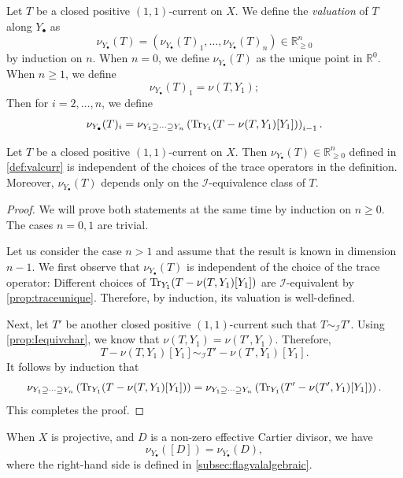 \begin{definition}\label{def:valcurr}
    Let $T$ be a closed positive $(1,1)$-current on $X$. We define the \emph{valuation} of $T$ along $Y_{\bullet}$ as
    \[
        \nu_{Y_{\bullet}}(T)=\left(\nu_{Y_{\bullet}}(T)_1,\ldots,\nu_{Y_{\bullet}}(T)_n\right)\in \mathbb{R}_{\geq 0}^n
    \]
    by induction on $n$. When $n=0$, we define $\nu_{Y_{\bullet}}(T)$ as the unique point in $\mathbb{R}^0$. When $n\geq 1$, we define
    \[
        \nu_{Y_{\bullet}}(T)_1=\nu(T,Y_1);
    \]
    Then for $i=2,\ldots,n$, we define
    \[
        \nu_{Y_{\bullet}}(T)_i=\nu_{Y_1\supseteq \cdots \supseteq Y_n}\left(\operatorname{Tr}_{Y_1}(T-\nu(T,Y_1)[Y_1])\right)_{i-1}.
    \]
\end{definition}

\begin{proposition}\label{prop:valcurr_Iind}
    Let $T$ be a closed positive $(1,1)$-current on $X$. Then $\nu_{Y_{\bullet}}(T)\in \mathbb{R}_{\geq 0}^n$ defined in \cref{def:valcurr} is independent of the choices of the trace operators in the definition. Moreover, $\nu_{Y_{\bullet}}(T)$ depends only on the $\mathcal{I}$-equivalence class of $T$.
\end{proposition}
\begin{proof}
    We will prove both statements at the same time by induction on $n\geq 0$. The cases $n=0,1$ are trivial.

    Let us consider the case $n>1$ and assume that the result is known in dimension $n-1$.
    We first observe that $\nu_{Y_{\bullet}}(T)$ is independent of the choice of the trace operator: Different choices of $\operatorname{Tr}_{Y_1}(T-\nu(T,Y_1)[Y_1])$ are $\mathcal{I}$-equivalent by \cref{prop:traceunique}. Therefore, by induction, its valuation is well-defined.

    Next, let $T'$ be another closed positive $(1,1)$-current such that $T\sim_{\mathcal{I}}T'$.
    Using \cref{prop:Iequivchar}, we know that $\nu(T,Y_1)=\nu(T',Y_1)$. Therefore,
    \[
        T- \nu(T,Y_1)[Y_1]\sim_{\mathcal{I}} T'-\nu(T',Y_1)[Y_1].
    \]
    It follows by induction that
    \[
        \nu_{Y_1\supseteq \cdots \supseteq Y_n}\left(\operatorname{Tr}_{Y_1}(T-\nu(T,Y_1)[Y_1])\right)=\nu_{Y_1\supseteq \cdots \supseteq Y_n}\left(\operatorname{Tr}_{Y_1}(T'-\nu(T',Y_1)[Y_1])\right).
    \]
    This completes the proof.
\end{proof}

\begin{example}\label{ex:valuationdivcompatible}
    When $X$ is projective, and $D$ is a non-zero effective Cartier divisor, we have
    \[
    \nu_{Y_{\bullet}}([D])=\nu_{Y_{\bullet}}(D),
    \]
    where the right-hand side is defined in \cref{subsec:flagvalalgebraic}.
\end{example}

